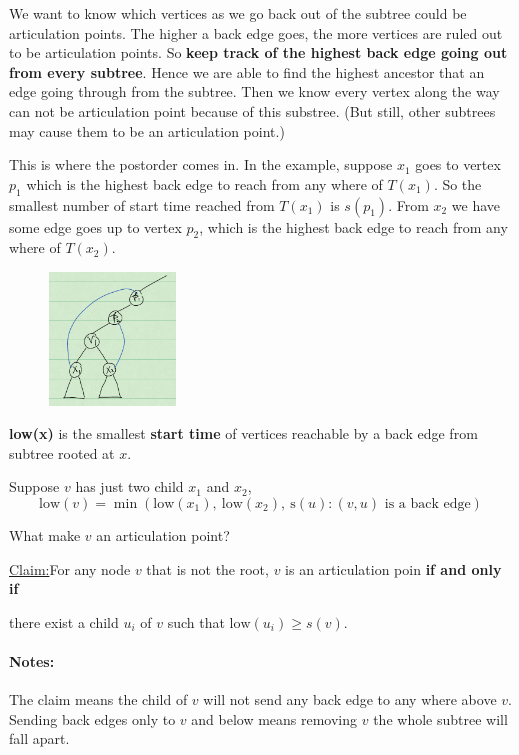 \documentclass[en,hazy,blue,screen,14pt]{elegantnote}
\newenvironment{claim}[1]{\par\noindent\underline{Claim:}\space#1}{}
\begin{document}
We want to know which vertices as we go back out of the subtree could be articulation points. The higher a back edge goes, the more vertices are ruled out to be articulation points. So \textbf{keep track of the highest back edge going out from every subtree}. Hence we are able to find the highest ancestor that an edge going through from the subtree. Then we know every vertex along the way can not be articulation point because of this substree. (But still, other subtrees may cause them to be an articulation point.)

This is where the postorder comes in. In the example, suppose $x_1$ goes to vertex $p_1$ which is the highest back edge to reach from any where of $T(x_1)$. So the smallest number of start time reached from $T(x_1)$ is $s(p_1)$. From $x_2$ we have some edge goes up to vertex $p_2$, which is the highest back edge to reach from any where of $T(x_2)$.

\begin{figure}[H]
\centering
\includegraphics[width=0.3\textwidth]{dfs-claim.png}
\end{figure}

\begin{definition}
 \textbf{low(x)} is the smallest \textbf{start time} of vertices reachable by a back edge from subtree rooted at $x$. 
\end{definition}

Suppose $v$ has just two child $x_1$ and $x_2$,
\[\text{low}(v) = \min (\text{low}(x_1), ~\text{low}(x_2), ~\text{s}(u): (v, u) \text{ is a back edge})\]

What make $v$ an articulation point?
\begin{claim}
 For any node $v$ that is not the root, $v$ is an articulation poin \textbf{if and only if }
 
 there exist a child $u_i$ of $v$ such that $\text{low}(u_i) \ge s(v)$.
\end{claim}

\paragraph{Notes:} The claim means the child of $v$ will not send any back edge 
to any where above $v$. Sending back edges only to $v$ and below means removing 
$v$ the whole subtree will fall apart.
\end{document}
